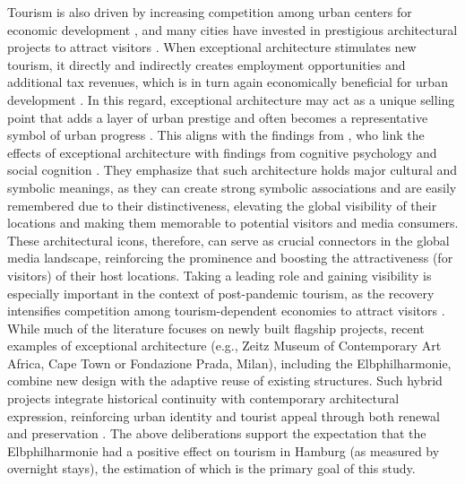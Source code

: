 \documentclass[a4paper, 12pt]{article}
\begin{document}
Tourism is also driven by increasing competition among urban centers for economic development \citep{hausler2024, sklair2017, zenker2013}, and many cities have invested in prestigious architectural projects to attract visitors \citep{andersson2014, ponzini2020}. When exceptional architecture stimulates new tourism, it directly and indirectly creates employment opportunities and additional tax revenues, which is in turn again economically beneficial for urban development \citep{alaily-mattar2018a, ben-dalia2013, plaza2006}. In this regard, exceptional architecture may act as a unique selling point that adds a layer of urban prestige \citep{andersson2014, romao2025} and often becomes a representative symbol of urban progress \citep{balke2018, boniface2021, scerri2019, specht2014}. This aligns with the findings from \citet{plaza2024}, who link the effects of exceptional architecture with findings from cognitive psychology and social cognition \citep{dimaggio1997}. They emphasize that such architecture holds major cultural and symbolic meanings, as they can create strong symbolic associations and are easily remembered due to their distinctiveness, elevating the global visibility of their locations and making them memorable to potential visitors and media consumers. These architectural icons, therefore, can serve as crucial connectors in the global media landscape, reinforcing the prominence and boosting the attractiveness (for visitors) of their host locations. Taking a leading role and gaining visibility is especially important in the context of post-pandemic tourism, as the recovery intensifies competition among tourism-dependent economies to attract visitors \citep{abbas2024}. While much of the literature focuses on newly built flagship projects, recent examples of exceptional architecture (e.g., Zeitz Museum of Contemporary Art Africa, Cape Town or Fondazione Prada, Milan), including the Elbphilharmonie, combine new design with the adaptive reuse of existing structures. Such hybrid projects integrate historical continuity with contemporary architectural expression, reinforcing urban identity and tourist appeal through both renewal and preservation \citep{alaily-mattar2018a, ponzini2020}. The above deliberations support the expectation that the Elbphilharmonie had a positive effect on tourism in Hamburg (as measured by overnight stays), the estimation of which is the primary goal of this study.
\end{document}
